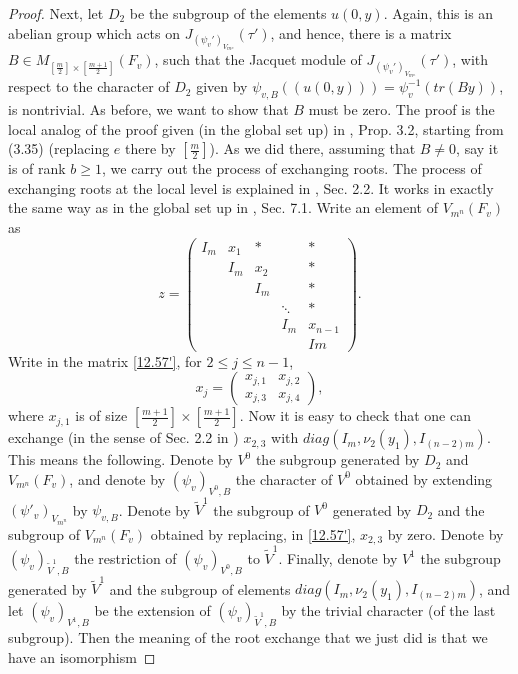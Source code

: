 \documentclass[12pts]{amsart}
\begin{document}
\begin{proof}
Next, let $D_2$ be the subgroup of the elements $u(0,y)$. Again, this is an abelian group which acts on $J_{(\psi_v')_{V_{m^n}}}(\tau')$, and hence, there is a matrix $B\in M_{[\frac{m}{2}]\times [\frac{m+1}{2}]}(F_v)$, such that the Jacquet module of $J_{(\psi_v')_{V_{m^n}}}(\tau')$, with respect to the character of $D_2$ given by $\psi_{v,B}((u(0,y)))=\psi_v^{-1}(tr(By))$, is nontrivial. As before, we want to show that $B$ must be zero. The proof is the local analog of the proof given (in the global set up) in \cite{GS18}, Prop. 3.2, starting from (3.35) (replacing $e$ there by $[\frac{m}{2}]$). As we did there, assuming that $B\neq 0$, say it is of rank $b\geq 1$, we carry out the process of exchanging roots. The process of exchanging roots at the local level is explained in \cite{GRS99}, Sec. 2.2. It works in exactly the same way as in the global set up in \cite{GRS11}, Sec. 7.1. Write an element of $V_{m^n}(F_v)$ as
\begin{equation}\label{12.57'}
z=\begin{pmatrix}I_m&x_1&\ast&&\ast\\&I_m&x_2&&\ast\\&&I_m&&\ast\\&&&\ddots&\ast\\&&&I_m&x_{n-1}\\&&&&Im\end{pmatrix}.
\end{equation} 
Write in the matrix \eqref{12.57'}, for $2\leq
j\leq n-1$,
$$
x_j=\begin{pmatrix}x_{j,1}&x_{j,2}\\x_{j,3}&x_{j,4}\end{pmatrix},
$$
where $x_{j,1}$ is of size $[\frac{m+1}{2}]\times [\frac{m+1}{2}]$. Now it is easy to check that one can exchange (in the sense of Sec. 2.2 in
\cite{GRS99}) $x_{2,3}$ with
$diag(I_m,\nu_2(y_1),I_{(n-2)m})$. This means the following. Denote by $V^0$ the subgroup generated by $D_2$ and $V_{m^n}(F_v)$, and denote by $(\psi_v)_{V^0,B}$ the character of $V^0$ obtained by
extending $(\psi'_v)_{V_{m^n}}$ by $\psi_{v,B}$. Denote by $\tilde{V}^1$ the subgroup of $V^0$ generated by $D_2$ and the subgroup of $V_{m^n}(F_v)$ obtained by replacing, in \eqref{12.57'}, 
$x_{2,3}$ by zero. Denote by $(\psi_v)_{\tilde{V}^1,B}$ the restriction of $(\psi_v)_{V^0,B}$ to $\tilde{V}^1$. Finally, denote by $V^1$ the subgroup generated by $\tilde{V}^1$ and the subgroup of elements $diag(I_m,\nu_2(y_1),I_{(n-2)m})$, and let $(\psi_v)_{V^1,B}$ be the extension of $(\psi_v)_{\tilde{V}^1,B}$ by the trivial character (of the last subgroup). Then the meaning of the root exchange that we just did is that we have an isomorphism 

\end{proof}
\end{document}

